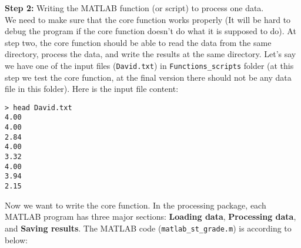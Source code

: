
\textbf{Step 2:} Writing the MATLAB function (or script) to process one data. \\

\noindent
We need to make sure that the core function works properly (It will be hard to debug the program if the core function doesn't do what it is supposed to do). At step two, the core function should be able to read the data from the same directory, process the data, and write the results at the same directory. Let's say we have one of the input files (\texttt{David.txt}) in \texttt{Functions\_scripts} folder (at this step we test the core function, at the final version there should not be any data file in this folder). Here is the input file content:\\

\begin{mdframed}[hidealllines=true,backgroundcolor=gray!20]
\begin{singlespace}
\fontsize{10pt}{1pt}
\texttt{> head David.txt \\
4.00 \\
4.00 \\
2.84 \\
4.00 \\
3.32 \\
4.00 \\
3.94 \\
2.15 
 }
\end{singlespace}
\end{mdframed}

\noindent
Now we want to write the core function. In the processing package, each MATLAB program has three major sections: \textbf{Loading data}, \textbf{Processing data},  and \textbf{Saving results}. The MATLAB code (\texttt{matlab\_st\_grade.m}) is according to below:
\vspace{5mm}

